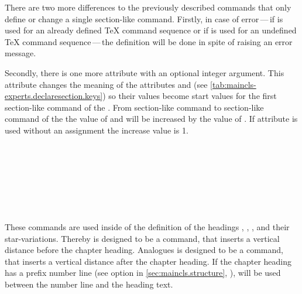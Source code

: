 There are two more differences to the previously described commands that only
define or change a single section-like command. Firstly, in case of error\,---\,if  is used for an already defined \TeX{}
command sequence or if  is used for an
undefined \TeX{} command sequence\,---\,the definition will be done in spite
of raising an error message.

Secondly, there is one more attribute  with an optional
integer argument. This attribute changes the meaning of the attributes
 and  (see
\autoref{tab:maincls-experts.declaresection.keys}) so their values become
start values for the first section-like command of the . From section-like command to section-like command of the  the value of  and 
will be increased by the value of . If attribute
 is used without an assignment the increase value is 1.
%
%
%
%
%

\begin{Declaration}
  \\
  \\
  \\
  \\
  \\
  \\
\end{Declaration}
%
%
%
%
%
%
%
These commands are used inside of the definition of the headings
, , ,
 and their star-variations. Thereby
 is designed to be a command, that inserts a
vertical distance before the chapter heading. Analogues
 is designed to be a command, that inserts a vertical
distance after the chapter heading. If the chapter heading has a prefix number line (see option
 in \autoref{sec:maincls.structure},
), 
will be used between the number line and the heading text.

